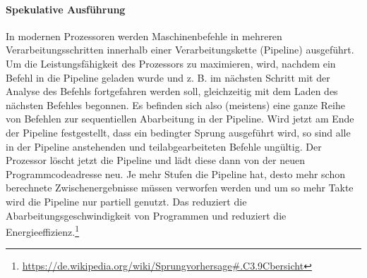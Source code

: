 \paragraph{Spekulative Ausführung}
In modernen Prozessoren werden Maschinenbefehle in mehreren Verarbeitungsschritten innerhalb einer Verarbeitungskette (Pipeline) ausgeführt. Um die Leistungsfähigkeit des Prozessors zu maximieren, wird, nachdem ein Befehl in die Pipeline geladen wurde und z. B. im nächsten Schritt mit der Analyse des Befehls fortgefahren werden soll, gleichzeitig mit dem Laden des nächsten Befehles begonnen. Es befinden sich also (meistens) eine ganze Reihe von Befehlen zur sequentiellen Abarbeitung in der Pipeline. Wird jetzt am Ende der Pipeline festgestellt, dass ein bedingter Sprung ausgeführt wird, so sind alle in der Pipeline anstehenden und teilabgearbeiteten Befehle ungültig. Der Prozessor löscht jetzt die Pipeline und lädt diese dann von der neuen Programmcodeadresse neu. Je mehr Stufen die Pipeline hat, desto mehr schon berechnete Zwischenergebnisse müssen verworfen werden und um so mehr Takte wird die Pipeline nur partiell genutzt. Das reduziert die Abarbeitungsgeschwindigkeit von Programmen und reduziert die Energieeffizienz.\footnote{\url{https://de.wikipedia.org/wiki/Sprungvorhersage\#.C3.9Cbersicht}}
